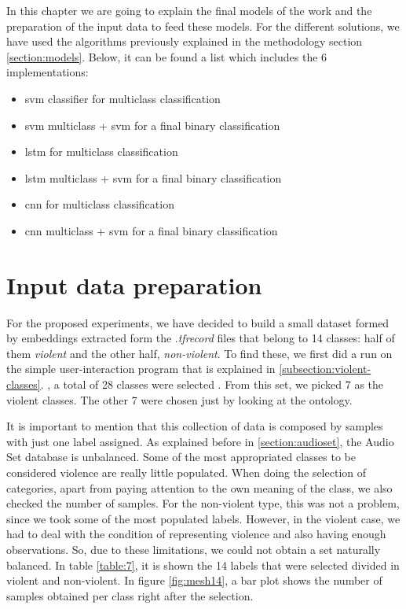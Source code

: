\label{chapter:experiments}

	In this chapter we are going to explain the final models of the work and the preparation of the input data to feed these models. For the different solutions, we have used the algorithms previously explained in the methodology section \ref{section:models}. Below, it can be found a list which includes the 6 implementations:
	
	\begin{itemize}
		\item \acrshort{svm} classifier for multiclass classification
		\item \acrshort{svm} multiclass + \acrshort{svm} for a final binary classification
		\item \acrshort{lstm} for multiclass classification
		\item \acrshort{lstm} multiclass + \acrshort{svm} for a final binary classification
		\item \acrshort{cnn} for multiclass classification
		\item \acrshort{cnn} multiclass + \acrshort{svm} for a final binary classification
	\end{itemize}
	

\section{Input data preparation}
\label{section:input-data-preparation}

	For the proposed experiments, we have decided to build a small dataset formed by embeddings extracted form the .\textit{tfrecord} files that belong to 14 classes: half of them \textit{violent} and the other half, \textit{non-violent}. To find these, we first did a run on the simple user-interaction program that is explained in \ref{subsection:violent-classes}. , a total of 28 classes were selected . From this set, we picked 7 as the violent classes. The other 7 were chosen just by looking at the ontology.
	
	It is important to mention that this collection of data is composed by samples with just one label assigned. As explained before in \ref{section:audioset}, the Audio Set database is unbalanced. Some of the most appropriated classes to be considered violence are really little populated. When doing the selection of categories, apart from paying attention to the own meaning of the class, we also checked the number of samples. For the non-violent type, this was not a problem, since we took some of the most populated labels. However, in the violent case, we had to deal with the condition of representing violence and also having enough observations. So, due to these limitations, we could not obtain a set naturally balanced. In table \ref{table:7}, it is shown the 14 labels that were selected divided in violent and non-violent. In figure \ref{fig:mesh14}, a bar plot shows the number of samples obtained per class right after the selection. 
	
